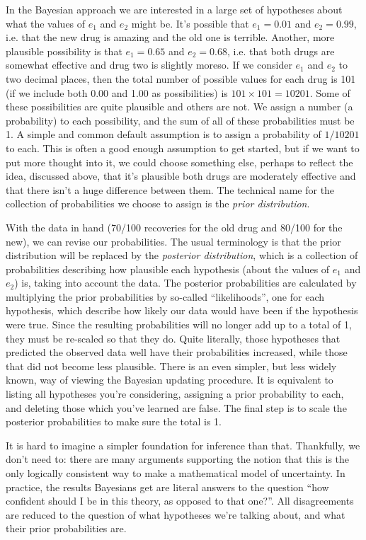 \documentclass[a4paper, 12pt]{article}
\begin{document}
In the Bayesian approach we are interested in a large set of hypotheses about
what the values of $e_1$ and $e_2$ might be. It's possible that $e_1=0.01$ and
$e_2 = 0.99$, i.e. that the new drug is amazing and the old one is terrible.
Another, more plausible possibility is that $e_1 = 0.65$ and $e_2=0.68$, i.e.
that both drugs are somewhat effective and drug two is slightly moreso. If we
consider $e_1$ and $e_2$ to two decimal places, then the total number of
possible values for each drug is 101 (if we include both 0.00 and 1.00 as
possibilities) is $101 \times 101 = 10201$.
Some of these possibilities are
quite plausible and others are not. We assign a number (a probability) to each
possibility, and the sum of all of these probabilities must be 1. A simple and
common default assumption is to assign a probability of $1/10201$ to each.
This is often a good enough assumption to get started, but if we want to put
more thought into it, we could choose something else, perhaps to reflect the
idea, discussed above, that it's plausible both drugs are moderately effective
and that there isn't a huge difference between them.
The technical name for the collection of
probabilities we choose to assign is the {\em prior distribution}.

With the data in hand (70/100 recoveries for the old drug and 80/100 for the
new), we can revise our probabilities. The usual terminology is that the
prior distribution will be replaced by the {\em posterior distribution}, which
is a collection of probabilities describing how plausible each hypothesis
(about the values of $e_1$ and $e_2$) is, taking into account the data.
The posterior probabilities are calculated by multiplying the prior probabilities
by so-called ``likelihoods'', one for each hypothesis,
which describe how likely our data would have been if the hypothesis were true.
Since the resulting probabilities will no longer add up to a total of 1, they
must be re-scaled so that they do.
Quite literally, those hypotheses that predicted the observed data well have
their probabilities increased, while those that did not become less
plausible.
There is an even simpler, but less widely known,
way of viewing the Bayesian updating procedure. It is equivalent to listing
all hypotheses you're considering, assigning a prior probability to each, and
deleting those which you've learned are false. The final step is to scale the
posterior probabilities to make sure the total is 1.

It is hard to imagine a simpler foundation for inference than that. Thankfully,
we don't need to: there are many arguments supporting the notion that this is
the only logically consistent way to make a mathematical model of uncertainty.
In practice, the results Bayesians get are literal answers to the question
``how confident should I be in this theory, as opposed to that one?''. All
disagreements are reduced to the question of what hypotheses we're talking
about, and what their prior probabilities are.
\end{document}
